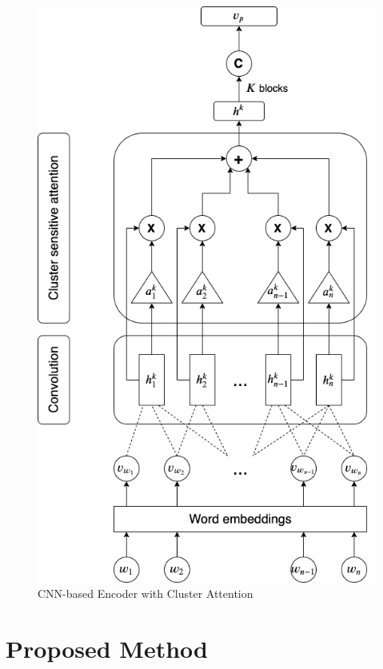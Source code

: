 \documentclass{bmcart}
\begin{document}
\begin{figure}[t!]
    \centering
    \captionsetup{justification=centering}
    \includegraphics[scale=0.3]{NN3.png}
    \caption{CNN-based Encoder with Cluster Attention}
    \label{fig:CNNEncoders}
\end{figure}

\section{Proposed Method} \label{sec:proposed_method}
\end{document}
